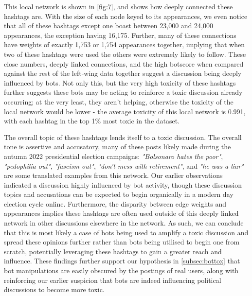 \documentclass[a4paper,11pt]{article}  %
\begin{document}
	This local network is shown in \autoref{fig:7}, and shows how deeply connected these hashtags are. With the size of each node keyed to its appearances, we even notice that all of these hashtags except one boast between 23,000 and 24,000 appearances, the exception having 16,175. Further, many of these connections have weights of exactly 1,753 or 1,754 appearances together, implying that when two of these hashtags were used the others were extremely likely to follow. These close numbers, deeply linked connections, and the high botscore when compared against the rest of the left-wing data together suggest a discussion being deeply influenced by bots. Not only this, but the very high toxicity of these hashtags further suggests these bots may be acting to reinforce a toxic discussion already occurring; at the very least, they aren't helping, otherwise the toxicity of the local network would be lower - the average toxicity of this local network is 0.991, with each hashtag in the top 1\% most toxic in the dataset.
	
	The overall topic of these hashtags lends itself to a toxic discussion. The overall tone is assertive and accusatory, many of these posts likely made during the autumn 2022 presidential election campaigns: \textit{"Bolsonaro hates the poor"}, \textit{"pedophilia out"}, \textit{"fascism out"}, \textit{"don't mess with retirement"}, and \textit{"he was a liar"} are some translated examples from this network. Our earlier observations indicated a discussion highly influenced by bot activity, though these discussion topics and accusations can be expected to begin organically in a modern day election cycle online. Furthermore, the disparity between edge weights and appearances implies these hashtags are often used outside of this deeply linked network in other discussions elsewhere in the network. As such, we can conclude that this is most likely a case of bots being used to amplify a toxic discussion and spread these opinions further rather than bots being utilised to begin one from scratch, potentially leveraging these hashtags to gain a greater reach and influence. These findings further support our hypothesis in \autoref{subsec:bottox} that bot manipulations are easily obscured by the postings of real users, along with reinforcing our earlier suspicion that bots are indeed influencing political discussions to become more toxic.
	
\end{document}
